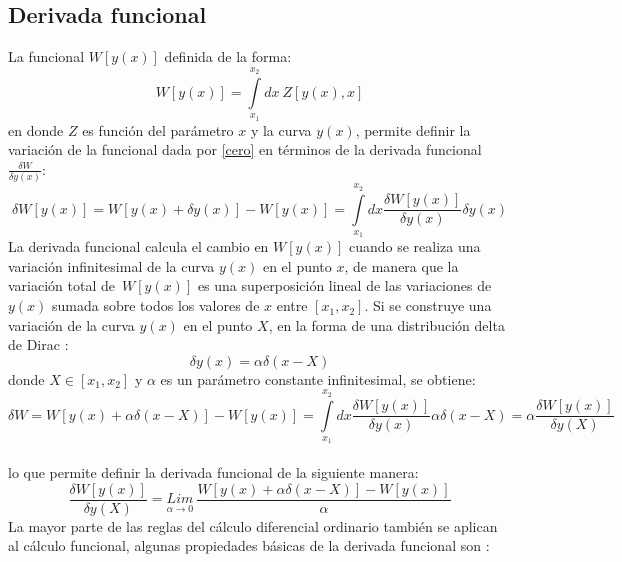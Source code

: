 \documentclass[a4paper,12pt]{article}
\begin{document}
\subsection{Derivada funcional}
La funcional $W[y(x)]$ definida de la forma:
\begin{equation}
W[y(x)]=\int\limits_{x_1}^{x_2}dx\ Z[y(x),x]
\label{cero}
\end{equation} 
en donde $Z$ es función del parámetro $x$ y la curva $y(x)$, permite definir la variación de la funcional dada por \eqref{cero} en términos de la derivada funcional $\frac{\delta W}{\delta y(x)}$:   
\begin{equation}
\delta W[y(x)]=W[y(x)+\delta y(x)]-W[y(x)]=\int\limits_{x_1}^{x_2}dx\frac{\delta  W[y(x)] }{\delta y(x)}\delta y(x) 
\label{varfun}
\end{equation}
La derivada funcional calcula el cambio en $W[y(x)]$ cuando se realiza una variación infinitesimal de la curva $y(x)$ en el punto $x$, de manera que la variación total \mbox{de $W[y(x)]$} es una superposición lineal de las variaciones de $y(x)$ sumada sobre todos los valores de $x$ entre $[x_1,x_2]$. Si se construye una variación de la curva $y(x)$ en el punto $X$, en la forma de una distribución delta de Dirac \cite{greiner,funcional}:
\begin{equation}
\delta y(x)=\alpha\delta(x-X)
\label{deltd}
\end{equation}
donde $X\in[x_1,x_2]$ y $\alpha$ es un parámetro constante infinitesimal, se obtiene:
{\small
\begin{equation}
\delta W=W[y(x)+\alpha\delta(x-X)]-W[y(x)]=\int\limits_{x_1}^{x_2}dx\frac{\delta  W[y(x)] }{\delta y(x)}\alpha\delta(x-X)=\alpha\frac{\delta  W[y(x)] }{\delta y(X)}
\end{equation}}\\
lo que permite definir la derivada funcional de la siguiente manera:
\begin{equation}
\frac{\delta  W[y(x)]}{\delta y(X)}=\underset{\alpha\rightarrow0}{Lim}\ \frac{W[y(x)+\alpha\delta(x-X)]-W[y(x)]}{\alpha}  
\label{defu}
\end{equation}
La mayor parte de las reglas del cálculo diferencial ordinario también se aplican al cálculo funcional, algunas propiedades básicas de la derivada funcional son \cite{greiner, funcional}:
\end{document}
